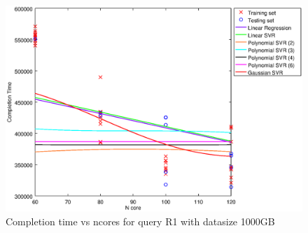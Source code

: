 
\begin {figure}[hbtp]
\centering
\includegraphics[width=\textwidth]{output/R1_1000_LINEAR_NCORE/plot_R1_1000.eps}
\caption{Completion time vs ncores for query R1 with datasize 1000GB}
\label{fig:coreonly_linear_R1_1000}
\end {figure}
